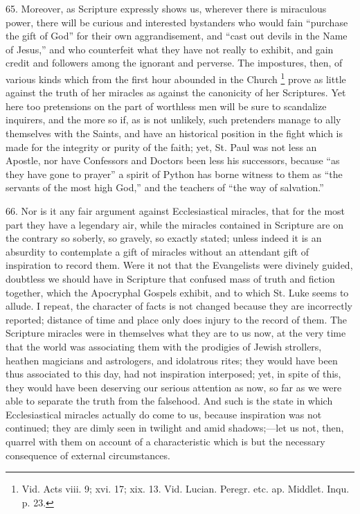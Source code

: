 65.
Moreover, as Scripture expressly shows us, wherever there is
miraculous power, there will be curious and interested bystanders who
would fain ``purchase the gift of God'' for their own aggrandisement,
and ``cast out devils in the Name of Jesus,'' and who counterfeit what
they have not really to exhibit, and gain credit and followers among
the ignorant and perverse. The impostures, then, of various
kinds which from the first hour abounded in the Church \footnote{Vid. Acts viii. 9; xvi. 17; xix. 13. Vid.
Lucian. Peregr. etc. ap. Middlet. Inqu. p. 23.} prove
as little against the truth of her miracles as against the canonicity
of her Scriptures. Yet here too pretensions on the part of worthless
men will be sure to scandalize inquirers, and the more so if, as is
not unlikely, such pretenders manage to ally themselves with the
Saints, and have an historical position in the fight which is made for
the integrity or purity of the faith; yet, St. Paul was not less an
Apostle, nor have Confessors and Doctors been less his successors,
because ``as they have gone to prayer'' a spirit of Python has borne
witness to them as ``the servants of the most high God,'' and the
teachers of ``the way of salvation.''

66.
Nor is it any fair argument against Ecclesiastical miracles, that for
the most part they have a legendary air, while the miracles contained
in Scripture are on the contrary so soberly, so gravely, so exactly
stated; unless indeed it is an absurdity to contemplate a gift of
miracles without an attendant gift of inspiration to record them. Were
it not that the Evangelists were divinely guided, doubtless we should
have in Scripture that confused mass of truth and fiction together,
which the Apocryphal Gospels exhibit, and to which St. Luke seems to
allude. I repeat, the character of facts is not changed because they
are incorrectly reported; distance of time and place only does
injury to the record of them. The Scripture miracles were in
themselves what they are to us now, at the very time that the world
was associating them with the prodigies of Jewish strollers, heathen
magicians and astrologers, and idolatrous rites; they would have been
thus associated to this day, had not inspiration interposed; yet, in
spite of this, they would have been deserving our serious attention as
now, so far as we were able to separate the truth from the falsehood.
And such is the state in which Ecclesiastical miracles actually do
come to us, because inspiration was not continued; they are dimly seen
in twilight and amid shadows;—let us not, then, quarrel with them on
account of a characteristic which is but the necessary consequence of
external circumstances.

